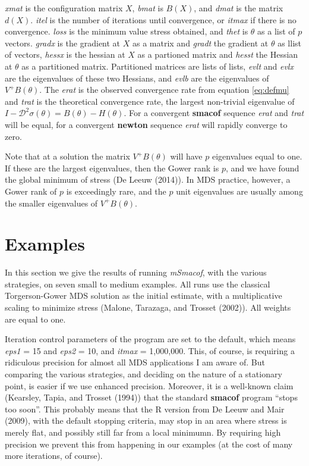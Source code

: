 \documentclass[
  12pt,
]{article}
\begin{document}
\emph{xmat} is the configuration matrix \(X\), \emph{bmat} is \(B(X)\), and \emph{dmat}
is the matrix \(d(X)\). \emph{itel} is the number of iterations until convergence, or
\emph{itmax} if there is no convergence. \emph{loss} is the minimum value stress obtained,
and \emph{thet} is \(\theta\) as a list of \(p\) vectors. \emph{gradx} is the gradient at \(X\)
as a matrix and \emph{gradt} the gradient at \(\theta\) as llist of vectors,
\emph{hessx} is the hessian at \(X\) as a partioned matrix and \emph{hesst} the Hessian at \(\theta\) as a partitioned matrix. Partitioned matrices are lists of lists,
\emph{evlt} and \emph{evlx} are the eigenvalues of these two Hessians, and \emph{evlb} are the eigenvalues of
\(V^+B(\theta)\). The \emph{erat} is the observed convergence rate from equation \eqref{eq:defmu} and \emph{trat} is the theoretical convergence rate, the largest non-trivial eigenvalue
of \(I-\mathcal{D}^2\sigma(\theta)=B(\theta)-H(\theta)\). For a convergent \textbf{smacof}
sequence \emph{erat} and \emph{trat} will be equal, for a convergent \textbf{newton} sequence
\emph{erat} will rapidly converge to zero.

Note that at a solution the matrix \(V^+B(\theta)\) will have \(p\) eigenvalues
equal to one. If these are the largest eigenvalues, then the Gower rank is \(p\), and
we have found the global minimum of stress (De Leeuw (2014)). In MDS practice, however,
a Gower rank of \(p\) is exceedingly rare, and the \(p\) unit eigenvalues are usually among the smaller
eigenvalues of \(V^+B(\theta)\).

\section{Examples}\label{examples}

In this section we give the results of running \emph{mSmacof}, with the various
strategies, on seven small to medium examples. All runs use the classical Torgerson-Gower MDS solution as the initial estimate, with a multiplicative scaling to minimize stress (Malone, Tarazaga, and Trosset (2002)). All weights are equal to one.

Iteration control parameters of the program
are set to the default, which means \emph{eps1} = 15 and \emph{eps2} = 10, and \emph{itmax}
= 1,000,000. This, of course, is requiring a ridiculous precision for almost all MDS applications I am aware of. But comparing the various strategies, and deciding on the nature of a stationary point, is easier if we use enhanced precision. Moreover, it is a well-known claim (Kearsley, Tapia, and Trosset (1994)) that the standard \textbf{smacof} program ``stops too soon''. This probably means that the R version from De Leeuw and Mair (2009), with the default stopping criteria, may stop in an area where stress is
merely flat, and possibly still far from a local minimumn.
By requiring high precision we prevent this from happening in our examples (at the cost of many more iterations, of course).
\end{document}
